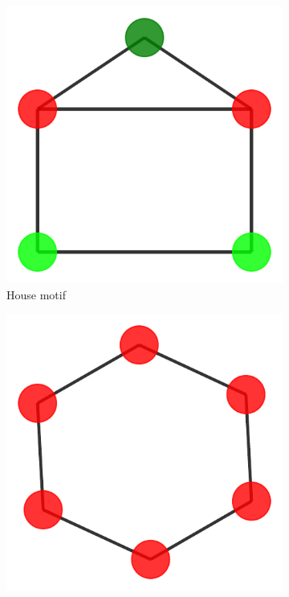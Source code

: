 \begin{figure}[h]
    \centering
    \begin{subfigure}[b]{0.2\textwidth}
        \includegraphics[width=\linewidth]{img/Motif_Vis/BA-Shapes-MOTIF.pdf}
        \caption{House motif}
    \end{subfigure}
    \begin{subfigure}[b]{0.2\textwidth}
        \includegraphics[width=\linewidth]{img/Motif_Vis/Tree-Cycles-MOTIF.pdf}

\end{subfigure}
\end{figure}
